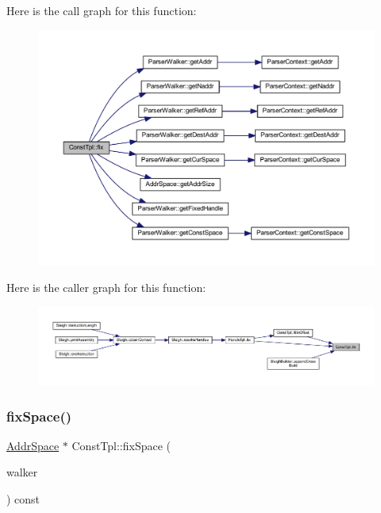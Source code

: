 Here is the call graph for this function\+:
\nopagebreak
\begin{figure}[H]
\begin{center}
\leavevmode
\includegraphics[width=350pt]{class_const_tpl_a2676416d2a1e9a14443ca54fb8af042d_cgraph}
\end{center}
\end{figure}
Here is the caller graph for this function\+:
\nopagebreak
\begin{figure}[H]
\begin{center}
\leavevmode
\includegraphics[width=350pt]{class_const_tpl_a2676416d2a1e9a14443ca54fb8af042d_icgraph}
\end{center}
\end{figure}
\mbox{\label{class_const_tpl_ab27ba4441dc79c4dd00dbd41d75d3e90}} 
\subsubsection{\texorpdfstring{fixSpace()}{fixSpace()}}
{\footnotesize\ttfamily \mbox{\hyperlink{class_addr_space}{Addr\+Space}} $\ast$ Const\+Tpl\+::fix\+Space (\begin{DoxyParamCaption}\item[{const \mbox{\hyperlink{class_parser_walker}{Parser\+Walker}} \&}]{walker }\end{DoxyParamCaption}) const}



